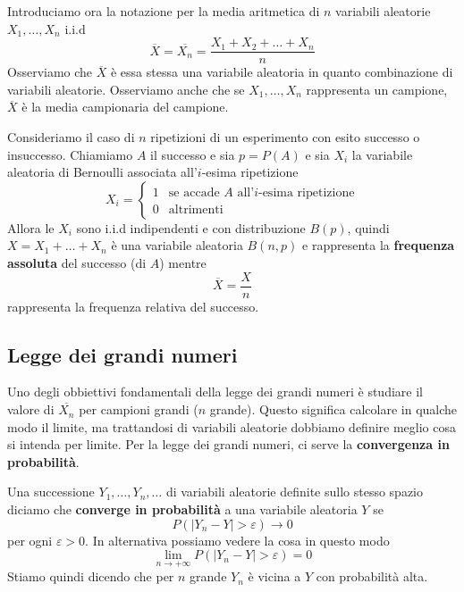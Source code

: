 Introduciamo ora la notazione per la media aritmetica di $n$ variabili aleatorie $X_1, \dots, X_n$
i.i.d
\[ \overline{X} = \overline{X_n} = \frac{X_1 + X_2 + \dots + X_n}{n} \]
Osserviamo che $\overline{X}$ è essa stessa una variabile aleatoria in quanto combinazione di
variabili aleatorie. Osserviamo anche che se $X_1, \dots, X_n$ rappresenta un campione,
$\overline{X}$ è la media campionaria del campione.

\begin{example}
	Consideriamo il caso di $n$ ripetizioni di un esperimento con esito successo o insuccesso.
	Chiamiamo $A$ il successo e sia $p = P(A)$ e sia $X_i$ la variabile aleatoria di Bernoulli
	associata all'$i$-esima ripetizione
	\[
		X_i = \begin{cases}
			1 & \text{se accade $A$ all'$i$-esima ripetizione} \\
			0 & \text{altrimenti}
		\end{cases}
	\]
	Allora le $X_i$ sono i.i.d indipendenti e con distribuzione $B(p)$, quindi $X=X_1+\dots+X_n$ è
	una variabile aleatoria $B(n,p)$ e rappresenta la \textbf{frequenza assoluta} del successo
	(di $A$) mentre
	\[ \overline{X} = \frac{X}{n} \]
	rappresenta la frequenza relativa del successo.
\end{example}

\subsection{Legge dei grandi numeri}
Uno degli obbiettivi fondamentali della legge dei grandi numeri è studiare il valore di
$\overline{X_n}$ per campioni grandi ($n$ grande). Questo significa calcolare in qualche modo il
limite, ma trattandosi di variabili aleatorie dobbiamo definire meglio cosa si intenda per limite.
Per la legge dei grandi numeri, ci serve la \textbf{convergenza in probabilità}.

\begin{definition}
	Una successione $Y_1, \dots, Y_n, \dots$ di variabili aleatorie definite sullo stesso spazio
	diciamo che \textbf{converge in probabilità} a una variabile aleatoria $Y$ se
	\[ P(|Y_n - Y| > \varepsilon) \to 0 \]
	per ogni $\varepsilon > 0$. In alternativa possiamo vedere la cosa in questo modo
	\[ \lim_{n \to +\infty} P(|Y_n - Y| > \varepsilon) = 0 \]
	Stiamo quindi dicendo che per $n$ grande $Y_n$ è vicina a $Y$ con probabilità alta.
\end{definition}

